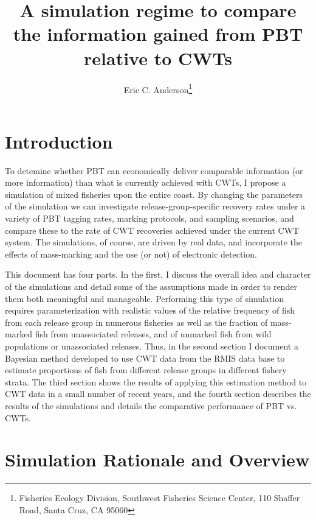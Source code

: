 \documentclass[11pt]{article}
\title{A simulation regime to compare the information
gained from PBT relative to CWTs}
\author{Eric C. Anderson\thanks{
    Fisheries Ecology Division, 
    Southwest Fisheries Science Center, 
    110 Shaffer Road,
    Santa Cruz, CA 95060}
}
\begin{document}
\maketitle

\begin{abstract}
\end{abstract}

\tableofcontents

\section{Introduction}

To detemine whether PBT can economically 
deliver comparable information (or more information) than what is currently achieved with CWTs,
I propose a simulation of
mixed fisheries upon the entire coast.  By changing the parameters of the
simulation we can investigate release-group-specific recovery rates
under a variety of PBT tagging rates, marking protocols, and sampling scenarios, and compare these
to the rate of CWT recoveries achieved under the current CWT system.
The simulations, of course, are driven by real data, and incorporate the effects of mass-marking and the use
(or not) of electronic detection.

This document has four parts.  In the first, I discuss the overall idea and character of the simulations
and detail some of the assumptions made in order to render them both meaningful and manageable.  
Performing this type of simulation
requires parameterization with realistic values of the  relative frequency of fish from each release group
in numerous fisheries as well as the fraction of mass-marked fish from unassociated releases, and 
of unmarked fish from wild populations or unassociated releases. Thus, in the second section I document
a Bayesian method developed to use CWT data from the RMIS data base to estimate proportions of fish from
different release groups in different fishery strata.  The third section shows the results of applying this
estimation method to CWT data in a small number of recent years, and the fourth section describes the results
of the simulations and details the comparative performance of PBT vs. CWTs.


\section{Simulation Rationale and Overview}
\end{document}
